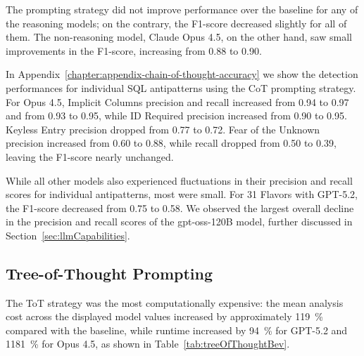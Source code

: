 The prompting strategy did not improve performance over the baseline for any of the reasoning models; on the contrary, the F1-score decreased slightly for all of them. The non-reasoning model, Claude Opus 4.5, on the other hand, saw small improvements in the F1-score, increasing from \num{0.88} to \num{0.90}.

In Appendix~\ref{chapter:appendix-chain-of-thought-accuracy} we show the detection performances for individual SQL antipatterns using the CoT prompting strategy. For Opus 4.5, Implicit Columns precision and recall increased from \num{0.94} to \num{0.97} and from \num{0.93} to \num{0.95}, while ID Required precision increased from \num{0.90} to \num{0.95}. Keyless Entry precision dropped from \num{0.77} to \num{0.72}. Fear of the Unknown precision increased from \num{0.60} to \num{0.88}, while recall dropped from \num{0.50} to \num{0.39}, leaving the F1-score nearly unchanged.

While all other models also experienced fluctuations in their precision and recall scores for individual antipatterns, most were small. For 31 Flavors with GPT-5.2, the F1-score decreased from \num{0.75} to \num{0.58}. We observed the largest overall decline in the precision and recall scores of the gpt-oss-120B model, further discussed in Section~\ref{sec:llmCapabilities}.

\subsection{Tree-of-Thought Prompting}

The ToT strategy was the most computationally expensive: the mean analysis cost across the displayed model values increased by approximately \qty{119}{\percent} compared with the baseline, while runtime increased by \qty{94}{\percent} for GPT-5.2 and \qty{1181}{\percent} for Opus 4.5, as shown in Table~\ref{tab:treeOfThoughtBev}.

